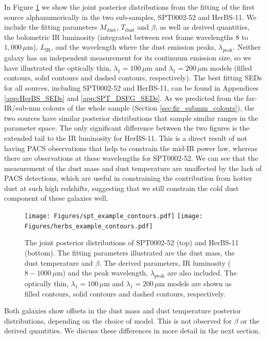 In Figure \ref{fig:example_SEDs} we show the joint posterior distributions from the fitting of the first source alphanumerically in the two sub-samples, SPT0002-52 and HerBS-11. We include the fitting parameters $M_{\textrm{dust}}$, $T_{\textrm{dust}}$ and $\beta$, as well as derived quantities, the bolometric IR luminosity (integrated between rest frame wavelengths $8$ to $1,000\,\mu$m), $L_\textrm{IR}$, and the wavelength where the dust emission peaks, $\lambda_\textrm{peak}$. Neither galaxy has an independent measurement for its continuum emission size, so we have illustrated the optically thin, $\lambda_1 = 100\,\mu$m and $\lambda_1 = 200\,\mu$m models (filled contours, solid contours and dashed contours, respectively). The best fitting SEDs for all sources, including SPT0002-52 and HerBS-11, can be found in Appendices \ref{app:HerBS_SEDs} and \ref{app:SPT_DSFG_SEDs}. As we predicted from the far-IR/sub-mm colours of the whole sample (Section \ref{sec:fir_submm_colours}), the two sources have similar posterior distributions that sample similar ranges in the parameter space. The only significant difference between the two figures is the extended tail to the IR luminosity for HerBS-11. This is a direct result of not having PACS observations that help to constrain the mid-IR power law, whereas there are observations at these wavelengths for SPT0002-52. We can see that the measurement of the dust mass and dust temperature are unaffected by the lack of PACS detections, which are useful in constraining the contribution from hotter dust at such high redshifts, suggesting that we still constrain the cold dust component of these galaxies well. 

\begin{figure}
	\centering
	\texttt{[image: Figures/spt\_example\_contours.pdf]}
	\texttt{[image: Figures/herbs\_example\_contours.pdf]}
	\caption[Posterior distributions for SPT0002-52 and HerBS-11]{The joint posterior distributions of SPT0002-52 (top) and HerBS-11 (bottom). The fitting parameters illustrated are the dust mass, the dust temperature and $\beta$. The derived parameters, IR luminosity ($8 - 1000\,\mu$m) and the peak wavelength, $\lambda_\textrm{peak}$ are also included. The optically thin, $\lambda_1 = 100\,\mu$m and $\lambda_1 = 200\,\mu$m models are shown as filled contours, solid contours and dashed contours, respectively.}
	\label{fig:example_SEDs}
\end{figure}

Both galaxies show offsets in the dust mass and dust temperature posterior distributions, depending on the choice of model. This is not observed for $\beta$ or the derived quantities. We discuss these differences in more detail in the next section.

